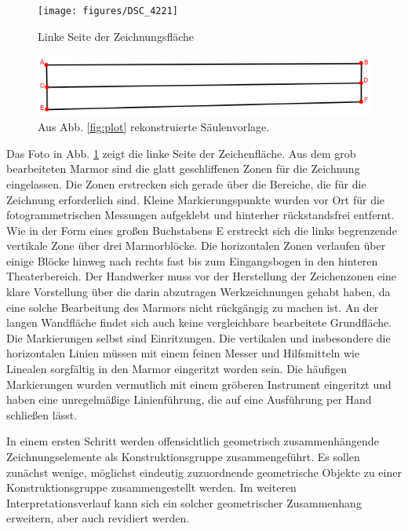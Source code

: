 \documentclass[twocolumn]{bmcart}
\begin{document}
\begin{figure}
\centering
\texttt{[image: figures/DSC\_4221]}
\caption{Linke Seite der Zeichnungsfläche}
\label{fig:DSC_4221}
\end{figure}

\begin{figure}[h]
\centering
\includegraphics[width=1.2\linewidth]{figures/ideal.png}
\caption{Aus Abb. \ref{fig:plot} rekonstruierte Säulenvorlage.}
\label{fig:plotideal}
\end{figure}


Das Foto in Abb. \ref{fig:DSC_4221} zeigt die linke Seite der Zeichenfläche. Aus dem grob bearbeiteten Marmor sind die glatt geschliffenen Zonen für die Zeichnung eingelassen. Die Zonen erstrecken sich gerade über die Bereiche, die für die Zeichnung erforderlich sind. Kleine Markierungspunkte wurden vor Ort für die fotogrammetrischen Messungen aufgeklebt und hinterher rückstandsfrei entfernt. Wie in der Form eines großen Buchstabens E erstreckt sich die links begrenzende vertikale Zone über drei Marmorblöcke. Die horizontalen Zonen verlaufen über einige Blöcke hinweg nach rechts fast bis zum Eingangsbogen in den hinteren Theaterbereich. Der Handwerker muss vor der Herstellung der Zeichenzonen eine klare Vorstellung über die darin abzutragen Werkzeichnungen gehabt haben, da eine solche Bearbeitung des Marmors nicht rückgängig zu machen ist. An der langen Wandfläche findet sich auch keine vergleichbare bearbeitete Grundfläche. Die Markierungen selbst sind Einritzungen. Die vertikalen und insbesondere die horizontalen Linien müssen mit einem feinen Messer und Hilfsmitteln wie  Linealen sorgfältig in den Marmor eingeritzt worden sein. Die häufigen Markierungen wurden vermutlich mit einem gröberen Instrument eingeritzt und  haben eine unregelmäßige Linienführung, die auf eine Ausführung per Hand schließen lässt.

In einem ersten Schritt werden offensichtlich geometrisch zusammenhängende Zeichnungselemente als Konstruktionsgruppe zusammengeführt. Es sollen zunächst wenige, möglichst eindeutig zuzuordnende geometrische Objekte zu einer Konstruktionsgruppe zusammengestellt werden. Im weiteren Interpretationsverlauf kann sich ein solcher geometrischer Zusammenhang erweitern, aber auch revidiert werden. 
\end{document}
